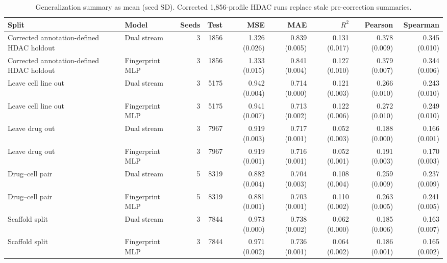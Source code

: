 \begin{landscape}
\begingroup
\scriptsize
\begin{table}[H]
\centering
\caption{Generalization summary as mean (seed SD). Corrected 1,856-profile HDAC runs replace stale pre-correction summaries.}
\label{tab:s_model_summary}
\begin{tabular}{@{}llrrrrrrr@{}}
\toprule
Split & Model & Seeds & Test & MSE & MAE & $R^2$ & Pearson & Spearman \\
\midrule
Corrected annotation-defined HDAC holdout & Dual stream & 3 & 1856 & 1.326 (0.026) & 0.839 (0.005) & 0.131 (0.017) & 0.378 (0.009) & 0.345 (0.010) \\
Corrected annotation-defined HDAC holdout & Fingerprint MLP & 3 & 1856 & 1.333 (0.015) & 0.841 (0.004) & 0.127 (0.010) & 0.379 (0.007) & 0.344 (0.006) \\
Leave cell line out & Dual stream & 3 & 5175 & 0.942 (0.004) & 0.714 (0.000) & 0.121 (0.003) & 0.266 (0.010) & 0.243 (0.010) \\
Leave cell line out & Fingerprint MLP & 3 & 5175 & 0.941 (0.007) & 0.713 (0.002) & 0.122 (0.006) & 0.272 (0.010) & 0.249 (0.010) \\
Leave drug out & Dual stream & 3 & 7967 & 0.919 (0.003) & 0.717 (0.001) & 0.052 (0.003) & 0.188 (0.000) & 0.166 (0.001) \\
Leave drug out & Fingerprint MLP & 3 & 7967 & 0.919 (0.001) & 0.716 (0.001) & 0.052 (0.001) & 0.191 (0.003) & 0.170 (0.003) \\
Drug--cell pair & Dual stream & 5 & 8319 & 0.882 (0.004) & 0.704 (0.003) & 0.108 (0.004) & 0.259 (0.009) & 0.237 (0.009) \\
Drug--cell pair & Fingerprint MLP & 5 & 8319 & 0.881 (0.001) & 0.703 (0.001) & 0.110 (0.002) & 0.263 (0.005) & 0.241 (0.005) \\
Scaffold split & Dual stream & 3 & 7844 & 0.973 (0.000) & 0.738 (0.002) & 0.062 (0.000) & 0.185 (0.006) & 0.163 (0.007) \\
Scaffold split & Fingerprint MLP & 3 & 7844 & 0.971 (0.002) & 0.736 (0.001) & 0.064 (0.002) & 0.186 (0.001) & 0.165 (0.002) \\
\bottomrule
\end{tabular}
\end{table}
\endgroup
\end{landscape}
